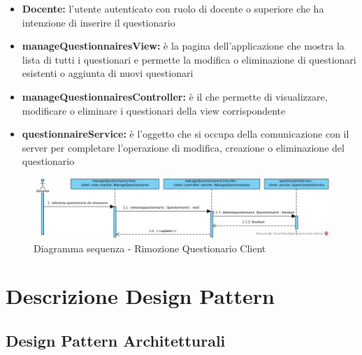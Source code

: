 \documentclass[12pt,a4paper]{article}
\begin{document}
\begin{itemize}
	\item \textbf{Docente:}	 l'utente autenticato con ruolo di docente o superiore che ha intenzione di inserire il questionario
	\item \textbf{manageQuestionnairesView:} è la pagina dell'applicazione che mostra la lista di tutti i questionari e permette la modifica o eliminazione di questionari esistenti o aggiunta di nuovi questionari
	\item \textbf{manageQuestionnairesController:} è il  che permette di visualizzare, modificare o eliminare i questionari della view corrispondente
	\item \textbf{questionnaireService:} è l'oggetto che si occupa della comunicazione con il server per completare l'operazione di modifica, creazione o eliminazione del questionario
\end{itemize}

\begin{center}
	\begin{figure}[H]
		\centering \includegraphics[max width=\myheight, angle=90]{../img/diagrammiSequenza/rimozioneQuestionarioClient.png}
		\caption{Diagramma sequenza - Rimozione Questionario Client}
	\end{figure}
\end{center}

\newpage
\appendix

\section{Descrizione Design Pattern}
\subsection{Design Pattern Architetturali}
\end{document}
